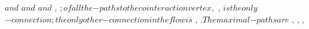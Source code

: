 \documentclass[a4paper]{LMCS}
\begin{document}
\begin{exa}
{{                              {\scriptstyle{}}
                              {\scriptscriptstyle{}}}}$ and ${{
                                {\scriptstyle{}}
                                {\scriptstyle{}}
                                {\scriptscriptstyle{}}}}$ and ${{
                                {\scriptstyle{}}
                                {\scriptstyle{}}
                                {\scriptscriptstyle{}}}}$ and ${{
                                {\scriptstyle{}}
                                {\scriptstyle{}}
                                {\scriptscriptstyle{}}}},{{
                                {\scriptstyle{}}
                                {\scriptstyle{}}
                                {\scriptscriptstyle{}}}}$; of all the ${}$-paths to the cointeraction vertex, ${{
                              {\scriptstyle{}}
                              {\scriptstyle{}}
                              {\scriptscriptstyle{}}}},{{
                                {\scriptstyle{}}
                                {\scriptstyle{}}
                                {\scriptscriptstyle{}}}}$ is the only ${}$-connection; the only other ${}$-connection in the flow is ${{
                                {\scriptstyle{}}
                                {\scriptstyle{}}
                                {\scriptscriptstyle{}}}},{{
                              {\scriptstyle{}}
                              {\scriptstyle{}}
                              {\scriptscriptstyle{}}}}$. The maximal ${}$-paths are ${{
                              {\scriptstyle{}}
                              {\scriptstyle{}}
                              {\scriptscriptstyle{}}}},{{
                              {\scriptstyle{}}
                              {\scriptstyle{}}
                              {\scriptscriptstyle{}}}},{{
                                {\scriptstyle{}}
                                {\scriptstyle{}}
                                {\scriptscriptstyle{}}}},{{
}}
\end{exa}
\end{document}
